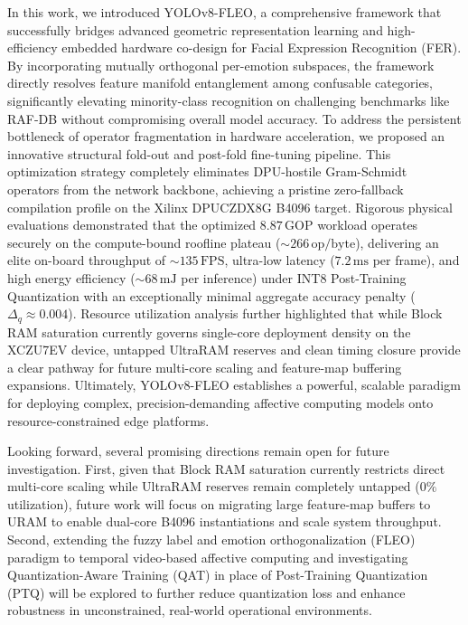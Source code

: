 \documentclass[algorithms,article,submit,moreauthors]{Definitions/mdpi}
\begin{document}
In this work, we introduced YOLOv8-FLEO, a comprehensive framework that successfully bridges advanced geometric representation learning and high-efficiency embedded hardware co-design for Facial Expression Recognition (FER). By incorporating mutually orthogonal per-emotion subspaces, the framework directly resolves feature manifold entanglement among confusable categories, significantly elevating minority-class recognition on challenging benchmarks like RAF-DB without compromising overall model accuracy. To address the persistent bottleneck of operator fragmentation in hardware acceleration, we proposed an innovative structural fold-out and post-fold fine-tuning pipeline. This optimization strategy completely eliminates DPU-hostile Gram-Schmidt operators from the network backbone, achieving a pristine zero-fallback compilation profile on the Xilinx DPUCZDX8G B4096 target. Rigorous physical evaluations demonstrated that the optimized $8.87\,\text{GOP}$ workload operates securely on the compute-bound roofline plateau ($\sim 266\,\text{op/byte}$), delivering an elite on-board throughput of $\sim 135\,\text{FPS}$, ultra-low latency ($7.2\,\text{ms}$ per frame), and high energy efficiency ($\sim 68\,\text{mJ}$ per inference) under INT8 Post-Training Quantization with an exceptionally minimal aggregate accuracy penalty ($\Delta_q \approx 0.004$). Resource utilization analysis further highlighted that while Block RAM saturation currently governs single-core deployment density on the XCZU7EV device, untapped UltraRAM reserves and clean timing closure provide a clear pathway for future multi-core scaling and feature-map buffering expansions. Ultimately, YOLOv8-FLEO establishes a powerful, scalable paradigm for deploying complex, precision-demanding affective computing models onto resource-constrained edge platforms.

Looking forward, several promising directions remain open for future investigation. First, given that Block RAM saturation currently restricts direct multi-core scaling while UltraRAM reserves remain completely untapped ($0\%$ utilization), future work will focus on migrating large feature-map buffers to URAM to enable dual-core B4096 instantiations and scale system throughput. Second, extending the fuzzy label and emotion orthogonalization (FLEO) paradigm to temporal video-based affective computing and investigating Quantization-Aware Training (QAT) in place of Post-Training Quantization (PTQ) will be explored to further reduce quantization loss and enhance robustness in unconstrained, real-world operational environments.
\end{document}
